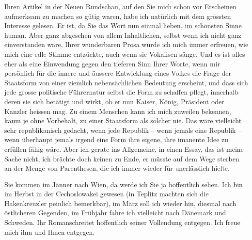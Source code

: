 \pstart
           Ihren Artikel in der Neuen Rundschau, auf den Sie mich schon vor
               Erscheinen aufmerksam zu machen so gütig waren, habe ich natürlich mit dem grössten
               Interesse gelesen. Er ist, da Sie das Wort nun einmal lieben, im schönsten Sinne
               human. Aber ganz abgesehen von allem Inhaltlichen, selbst wenn ich nicht ganz
               einverstanden wäre, Ihrer wunderbaren Prosa würde ich mich immer erfreuen, wie mich
               eine {\pb}edle Stimme entzückte, auch wenn sie Vokalisen
               sänge. Und es ist alles eher als eine Einwendung gegen den tieferen Sinn Ihrer Worte,
               wenn mir persönlich für die innere und äussere Entwicklung eines Volkes die Frage der
               Staatsform von einer ziemlich nebensächlichen Bedeutung erscheint, und dass sich jede
               grosse politische Führernatur selbst die Form zu schaffen pflegt, innerhalb deren sie
               sich betätigt und wirkt, ob er nun Kaiser, König, Präsident oder Kanzler heissen mag.
               Zu einem Menschen kann ich mich zuweilen bekennen, kaum je ohne Vorbehalt, zu einer
               Staatsform als solcher nie. Das wäre vielleicht sehr republikanisch gedacht, wenn
               jede Republik – wenn jemals eine Republik – wenn überhaupt jemals irgend eine Form
               ihre eigene, ihre imanente Idee zu erfüllen fähig wäre. Aber ich gerate
               ins Allgemeine, in einen Essay, das ist meine Sache nicht, ich brächte doch keinen zu
               Ende, er müsste auf dem Wege sterben an der Menge von Parenthesen, die ich immer
               wieder für unerlässlich hielte.\pend
           
\pstart
           Sie kommen im Jänner nach Wien, da
               werde ich Sie ja hoffentlich sehen. Ich bin im Herbst in der Cechoslowakei gewesen (in Teplitz machten sich die Hakenkreuzler peinlich
               bemerkbar), im März{ }soll ich wieder hin, diesmal nach östlicheren
               Gegenden, im Frühjahr fahre ich vielleicht nach Dänemark und Schweden. Ihr Romanschreitet hoffentlich seiner Vollendung entgegen.
               Ich freue mich ihm und Ihnen entgegen.\pend
           
